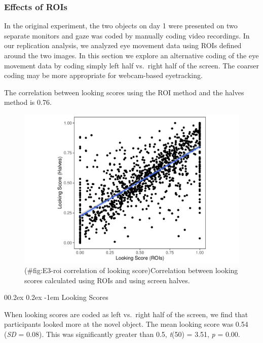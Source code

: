 \documentclass[
  man,floatsintext]{apa6}
\makeatletter
\let\oldparagraph\paragraph
\renewcommand{\paragraph}[1]{\oldparagraph{#1}\mbox{}}
\renewcommand{\paragraph}{\@startsection{paragraph}{4}{\parindent}%
  {0\baselineskip \@plus 0.2ex \@minus 0.2ex}%
  {-1em}%
  {\normalfont\normalsize\bfseries\itshape\typesectitle}}
\makeatother
\begin{document}
\hypertarget{effects-of-rois}{%
\subsubsection{Effects of ROIs}\label{effects-of-rois}}

In the original experiment, the two objects on day 1 were presented on two separate monitors and gaze was coded by manually coding video recordings. In our replication analysis, we analyzed eye movement data using ROIs defined around the two images. In this section we explore an alternative coding of the eye movement data by coding simply left half vs.~right half of the screen. The coarser coding may be more appropriate for webcam-based eyetracking.

The correlation between looking scores using the ROI method and the halves method is 0.76.

\begin{figure}
\centering
\includegraphics{manuscript_files/figure-latex/E3-roi correlation of looking score-1.pdf}
\caption{(\#fig:E3-roi correlation of looking score)Correlation between looking scores calculated using ROIs and using screen halves.}
\end{figure}

\hypertarget{looking-scores}{%
\paragraph{Looking Scores}\label{looking-scores}}

When looking scores are coded as left vs.~right half of the screen, we find that participants looked more at the novel object. The mean looking score was 0.54 (\emph{SD} = 0.08). This was significantly greater than 0.5, \emph{t}(50) = 3.51, \emph{p} = 0.00.
\end{document}
